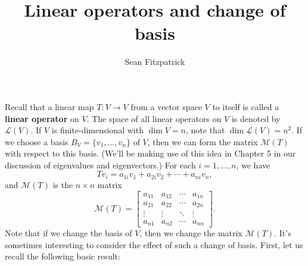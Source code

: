 \documentclass[12pt,letterpaper]{article}
\author{Sean Fitzpatrick}
\title{Linear operators and change of basis}
\renewcommand{\L}{\mathcal{L}}
\newcommand{\M}{\mathcal{M}}
\begin{document}
\maketitle

Recall that a linear map $T:V\to V$ from a vector space $V$ to itself is called a {\bf linear operator} on $V$. The space of all linear operators on $V$ is denoted by $\L(V)$. If $V$ is finite-dimensional with $\dim V = n$, note that $\dim \L(V) = n^2$. If we choose a basis $B_V = \{v_1,\ldots, v_n\}$ of $V$, then we can form the matrix $\M(T)$ with respect to this basis. (We'll be making use of this idea in Chapter 5 in our discussion of eigenvalues and eigenvectors.) For each $i=1,\ldots, n$, we have
\[
Tv_i = a_{1i}v_1+a_{2i}v_2+\cdots + a_{ni}v_n,
\]
and $\M(T)$ is the $n\times n$ matrix
\[
\M(T) = \begin{bmatrix}
a_{11}&a_{12}&\cdots & a_{1n}\\
a_{21}&a_{22}&\cdots & a_{2n}\\
\vdots & \vdots &\ddots & \vdots\\
a_{n1}&a_{n2}&\cdots &a_{nn}
\end{bmatrix}.
\]
Note that if we change the basis of $V$, then we change the matrix $\M(T)$. It's sometimes interesting to consider the effect of such a change of basis. First, let us recall the following basic result:
\end{document}
